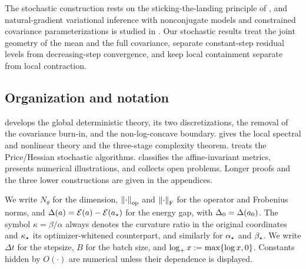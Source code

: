 The stochastic construction rests on the sticking-the-landing principle of
\citet{roeder2017sticking}, and natural-gradient variational inference with
nonconjugate models and constrained covariance parameterizations is studied in
\citet{sun2025natural}. Our stochastic results treat the joint geometry of the
mean and the full covariance, separate constant-step residual levels from
decreasing-step convergence, and keep local containment separate from local
contraction.

\subsection*{Organization and notation}

 develops the global deterministic theory, its two
discretizations, the removal of the covariance burn-in, and the non-log-concave
boundary.  gives the local spectral and nonlinear theory and the
three-stage complexity theorem.  treats the Price/Hessian
stochastic algorithms.  classifies the affine-invariant
metrics,  presents numerical illustrations, and
 collects open problems. Longer proofs and the three lower
constructions are given in the appendices.

We write $N_\theta$ for the dimension, $\left\lVert \cdot\right\rVert_{\mathrm{op}}$ and
$\left\lVert \cdot\right\rVert_{\mathrm{F}}$ for the operator and Frobenius norms, and
$\Delta(a) = \mathcal{E}(a) - \mathcal{E}(a_\star)$ for the energy gap, with
$\Delta_0 = \Delta(a_0)$. The symbol $\kappa = \beta/\alpha$ always denotes the
curvature ratio in the original coordinates and $\kappa_\star$ its
optimizer-whitened counterpart, and similarly for $\alpha_\star$ and $\beta_\star$.
We write $\Delta t$ for the stepsize, $B$ for the batch size, and
$\log_+ x := \max\{\log x, 0\}$. Constants hidden by $O(\cdot)$ are numerical
unless their dependence is displayed.
